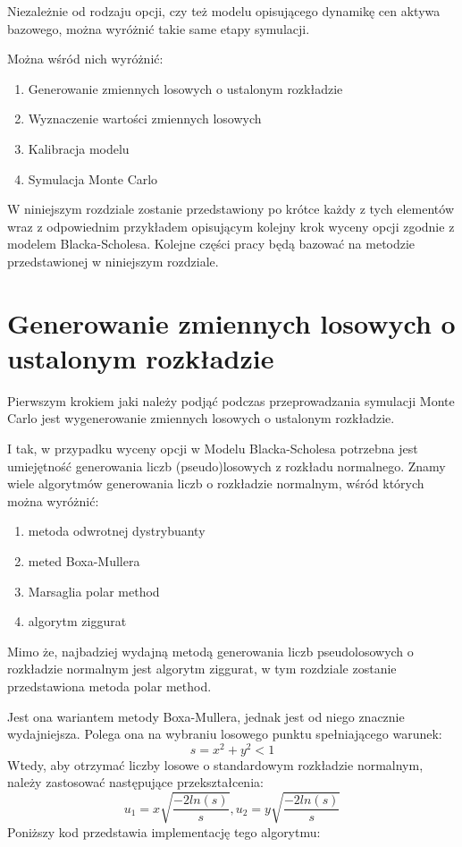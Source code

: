 \documentclass{pracamgr}
\begin{document}
Niezależnie od rodzaju opcji, czy też modelu opisującego dynamikę cen aktywa bazowego, można 
wyróżnić takie same etapy symulacji. 

Można wśród nich wyróżnić:
\begin{enumerate}
  \item Generowanie zmiennych losowych o ustalonym rozkładzie
  \item Wyznaczenie wartości zmiennych losowych
  \item Kalibracja modelu
  \item Symulacja Monte Carlo
\end{enumerate}

W niniejszym rozdziale zostanie przedstawiony po krótce każdy z tych elementów wraz z odpowiednim przykładem opisującym kolejny krok wyceny opcji zgodnie z modelem Blacka-Scholesa.
Kolejne części pracy będą bazować na metodzie przedstawionej w niniejszym rozdziale.

\section{Generowanie zmiennych losowych o ustalonym rozkładzie}

Pierwszym krokiem jaki należy podjąć podczas przeprowadzania symulacji Monte Carlo jest 
wygenerowanie zmiennych losowych o ustalonym rozkładzie.

I tak, w przypadku wyceny opcji w Modelu Blacka-Scholesa potrzebna jest umiejętność generowania liczb (pseudo)losowych z rozkładu normalnego. Znamy wiele algorytmów generowania liczb o rozkładzie normalnym, wśród których można wyróżnić:
\begin{enumerate}
  \item metoda odwrotnej dystrybuanty
  \item meted Boxa-Mullera
  \item Marsaglia polar method
  \item algorytm ziggurat
\end{enumerate}

Mimo że, najbadziej wydajną metodą generowania liczb pseudolosowych o rozkładzie normalnym jest algorytm ziggurat, w tym rozdziale zostanie przedstawiona metoda polar method.

Jest ona wariantem metody Boxa-Mullera, jednak jest od niego znacznie wydajniejsza.
Polega ona na wybraniu losowego punktu spełniającego warunek:
\begin{equation}
  s = x^2 + y^2 < 1
\end{equation}
Wtedy, aby otrzymać liczby losowe o standardowym rozkładzie normalnym, należy zastosować następujące przekształcenia:
\begin{equation}
  u_1 = x \sqrt{\frac{-2ln(s)}{s}}, u_2 = y \sqrt{\frac{-2ln(s)}{s}}
\end{equation}
Poniższy kod przedstawia implementację tego algorytmu:
\end{document}
